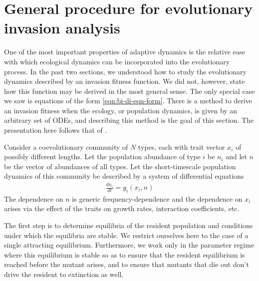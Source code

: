 \section{General procedure for evolutionary invasion analysis}
\label{section:general-invasion-analysis}

One of the most important properties of adaptive dynamics is the relative ease with which ecological dynamics can be incorporated into the evolutionary process. 
In the past two sections, we understood how to study the evolutionary dynamics described by an invasion fitness function.
We did not, however, state how this function may be derived in the most general sense.
The only special case we saw is equations of the form \eqref{eqn:bi-di-eqn-form}.
There is a method to derive an invasion fitness when the ecology, or population dynamics, is given by an arbitrary set of ODEs, and describing this method is the goal of this section.
The presentation here follows that of \cite{otto_biologists_2007}. 

Consider a coevolutionary community of $N$ types, each with trait vector $x_i$ of possibly different lengths. 
Let the population abundance of type $i$ be $n_i$ and let $n$ be the vector of abundances of all types. 
Let the short-timescale population dynamics of this community be described by a system of differential equations 
\begin{align}
	\frac{dn_i}{dt} = g_i(x_i,n)
\end{align}
The dependence on $n$ is generic frequency-dependence and the dependence on $x_i$ arises via the effect of the traits on growth rates, interaction coefficients, etc. 

The first step is to determine equilibria of the resident population and conditions under which the equilibria are stable. 
We restrict ourselves here to the case of a single attracting equilibrium. 
Furthermore, we work only in the parameter regime where this equilibrium is stable so as to ensure that the resident equilibrium is reached before the mutant arises, and to ensure that mutants that die out don't drive the resident to extinction as well. 

